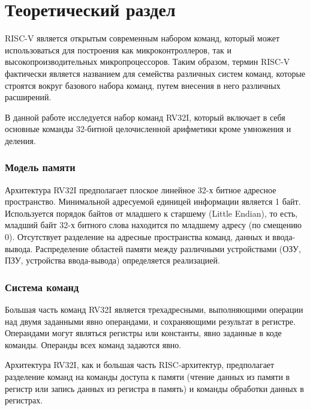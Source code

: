 \chapter{Теоретический раздел}
RISC-V является открытым современным набором команд, который может использоваться для построения как микроконтроллеров, так и высокопроизводительных микропроцессоров. Таким образом, термин RISC-V фактически является названием для семейства различных систем команд, которые строятся вокруг базового набора команд, путем внесения в него различных расширений.

В данной работе исследуется набор команд RV32I, который включает в себя основные команды 32-битной целочисленной арифметики кроме умножения и деления.

\subsection*{Модель памяти}
Архитектура RV32I предполагает плоское линейное 32-х битное адресное пространство. Минимальной адресуемой единицей информации является 1 байт. Используется порядок байтов от младшего к старшему (Little Endian), то есть, младший байт 32-х битного слова находится по младшему адресу (по смещению 0). Отсутствует разделение на адресные пространства команд, данных и ввода-вывода. Распределение областей памяти между различными устройствами (ОЗУ, ПЗУ, устройства ввода-вывода) определяется реализацией.

\subsection*{Система команд}
Большая часть команд RV32I является трехадресными, выполняющими операции над двумя заданными явно операндами, и сохраняющими результат в регистре. Операндами могут являться регистры или константы, явно заданные в коде команды. Операнды всех команд задаются явно.

Архитектура RV32I, как и большая часть RISC-архитектур, предполагает разделение команд на команды доступа к памяти (чтение данных из памяти в регистр или запись данных из регистра в память) и команды обработки данных в регистрах.

